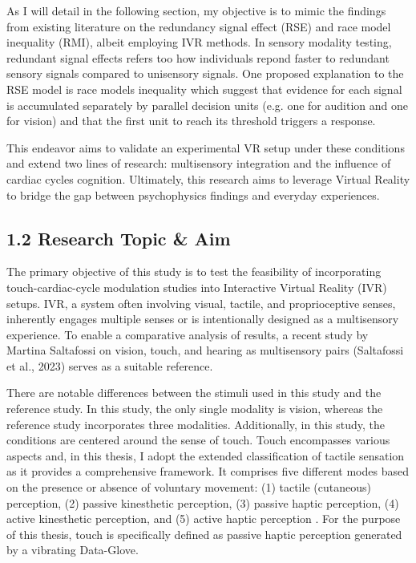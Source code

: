 \documentclass[12pt,oneside,openright]{report}
\begin{document}
As I will detail in the following section, my objective is to mimic the findings from existing literature on the redundancy signal effect (RSE) and race model inequality (RMI), albeit employing IVR methods. In sensory modality testing, redundant signal effects refers too how individuals repond faster to redundant sensory signals compared to unisensory signals. One proposed explanation to the RSE model is race models inequality which suggest that evidence for each signal is accumulated separately by parallel decision units (e.g. one for audition and one for vision) and that the first unit to reach its threshold triggers a response.

This endeavor aims to validate an experimental VR setup under these conditions and extend two lines of research: multisensory integration and the influence of cardiac cycles cognition. Ultimately, this research aims to leverage Virtual Reality to bridge the gap between psychophysics findings and everyday experiences.

\subsection*{1.2 Research Topic \& Aim}

The primary objective of this study is to test the feasibility of incorporating touch-cardiac-cycle modulation studies into Interactive Virtual Reality (IVR) setups. IVR, a system often involving visual, tactile, and proprioceptive senses, inherently engages multiple senses or is intentionally designed as a multisensory experience. To enable a comparative analysis of results, a recent study by Martina Saltafossi on vision, touch, and hearing as multisensory pairs (Saltafossi et al., 2023) serves as a suitable reference.

There are notable differences between the stimuli used in this study and the reference study. In this study, the only single modality is vision, whereas the reference study incorporates three modalities. Additionally, in this study, the conditions are centered around the sense of touch. Touch encompasses various aspects and, in this thesis, I adopt the extended classification of tactile sensation as it provides a comprehensive framework. It comprises five different modes based on the presence or absence of voluntary movement: (1) tactile (cutaneous) perception, (2) passive kinesthetic perception, (3) passive haptic perception, (4) active kinesthetic perception, and (5) active haptic perception \parencite{Healy2003HandbookOP}. For the purpose of this thesis, touch is specifically defined as passive haptic perception generated by a vibrating Data-Glove.
\end{document}
